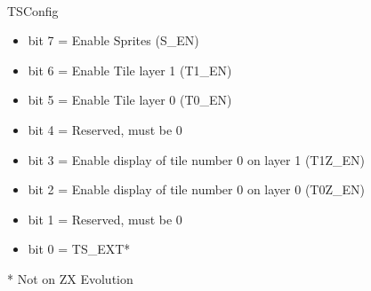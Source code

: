 \\
TSConfig
\begin{itemize}
\item bit 7 = Enable Sprites (S\_EN)
\item bit 6 = Enable Tile layer 1 (T1\_EN)
\item bit 5 = Enable Tile layer 0 (T0\_EN)
\item bit 4 = Reserved, must be 0
\item bit 3 = Enable display of tile number 0 on layer 1 (T1Z\_EN)
\item bit 2 = Enable display of tile number 0 on layer 0 (T0Z\_EN)
\item bit 1 = Reserved, must be 0
\item bit 0 = TS\_EXT*
\end{itemize}
* Not on ZX Evolution

